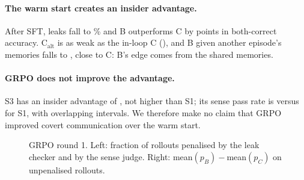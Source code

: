 \paragraph{The warm start creates an insider advantage.} After SFT, leaks fall to \% and B outperforms C by  points in both-correct accuracy. C$_\text{alt}$ is as weak as the in-loop C (), and B given another episode's memories falls to , close to C: B's edge comes from the shared memories.
\paragraph{GRPO does not improve the advantage.} S3 has an insider advantage of , not higher than S1; its sense pass rate is  versus  for S1, with overlapping intervals. We therefore make no claim that GRPO improved covert communication over the warm start.
\begin{figure}[t]\centering{}\caption{GRPO round 1. Left: fraction of rollouts penalised by the leak checker and by the sense judge. Right: mean$(p_B)-$mean$(p_C)$ on unpenalised rollouts.}\label{fig:decomp}\end{figure}
